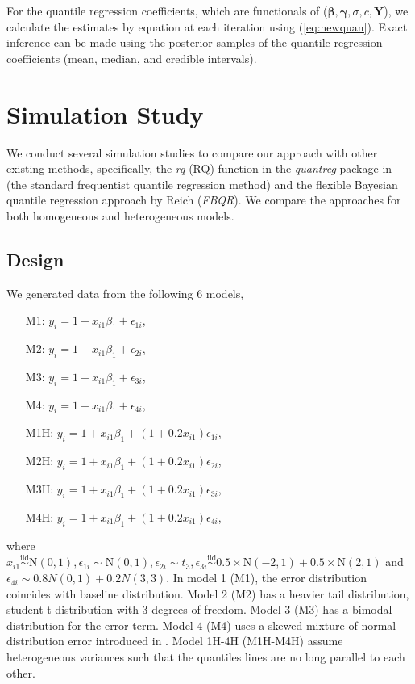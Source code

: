 \documentclass[12pt]{article}
\begin{document}
For the quantile regression coefficients, which are functionals of
($\bm \beta, \bm \gamma, \sigma, c, \bm Y$), we calculate the
estimates by equation at each iteration using
(\ref{eq:newquan}). Exact inference can be made using the posterior
samples of the quantile regression coefficients (mean, median, and
credible intervals).

\section{Simulation Study}
\label{sec:simulations}
We conduct several simulation studies to compare our approach with
other existing methods, specifically, the \textit{rq} (RQ) function in the
\textit{quantreg} package \citep{quantreg} in \cite{R} (the standard
frequentist quantile regression method) and the flexible Bayesian
quantile regression approach by Reich (\textit{FBQR}).  We compare the
approaches for both homogeneous and heterogeneous models.

\subsection{Design}
We generated data from the following 6 models,
\begin{itemize}
\item [M1:] $y_i = 1 + x_{i1}\beta_1 + \epsilon_{1i}$,
\item [M2:] $y_i = 1 + x_{i1}\beta_1 + \epsilon_{2i}$,
\item [M3:] $y_i = 1 + x_{i1}\beta_1 + \epsilon_{3i}$,
\item [M4:] $y_i = 1 + x_{i1}\beta_1 + \epsilon_{4i}$,
\item [M1H:] $y_i = 1 + x_{i1}\beta_1 + (1 + 0.2x_{i1})
  \epsilon_{1i}$,
\item [M2H:] $y_i = 1 + x_{i1}\beta_1 + (1 + 0.2x_{i1})
  \epsilon_{2i}$,
\item [M3H:] $y_i = 1 + x_{i1}\beta_1 + (1 + 0.2x_{i1})
  \epsilon_{3i}$,
\item [M4H:] $y_i = 1 + x_{i1}\beta_1 + (1 + 0.2x_{i1})
  \epsilon_{4i}$,
\end{itemize}
where $x_{i1} \stackrel{\mbox{iid}}{\sim} \mathrm{N}(0,1),
\epsilon_{1i} \sim \mathrm{N}(0,1), \epsilon_{2i} \sim t_3,
\epsilon_{3i} \stackrel{\mbox{iid}}{\sim} 0.5 \times \mathrm{N}(-2,1)
+ 0.5 \times \mathrm{N}(2,1)$ and $\epsilon_{4i} \sim 0.8 N(0,1) + 0.2
N(3,3)$. In model 1 (M1), the error distribution coincides with
baseline distribution. Model 2 (M2) has a heavier tail distribution,
student-t distribution with 3 degrees of freedom. Model 3 (M3) has a
bimodal distribution for the error term.  Model 4 (M4) uses a skewed
mixture of normal distribution error introduced in
\citet{reich2010}. Model 1H-4H (M1H-M4H) assume heterogeneous
variances such that the quantiles lines are no long parallel to each
other.
\end{document}
